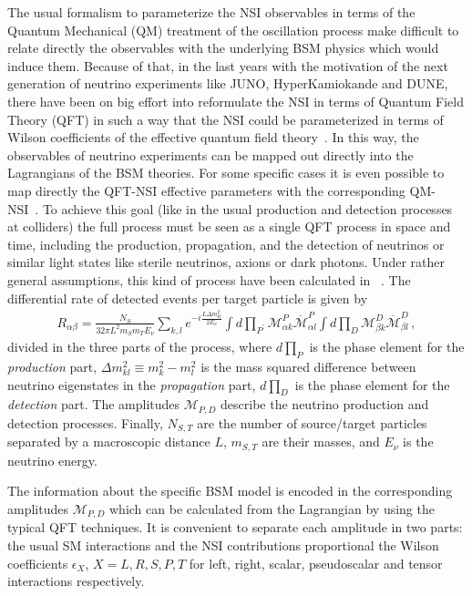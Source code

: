 \documentclass[a4paper,10pt,epsfig,epsf,amsfonts,amsmath]{article}
\begin{document}
The usual formalism to parameterize the NSI observables in terms of the Quantum Mechanical (QM) treatment of the oscillation process make difficult to relate directly the observables with the underlying BSM physics which would induce them. Because of that, in the last years
with the motivation of the next generation of neutrino experiments like JUNO, HyperKamiokande and DUNE, 
there have been on big effort into reformulate the NSI in terms of Quantum Field Theory (QFT) in such a way that the NSI could be parameterized in terms of Wilson
coefficients of the effective quantum field theory~\cite{}. In this way, the observables of neutrino experiments can be mapped out directly into the Lagrangians of the BSM theories.
For some specific cases it is even possible to map directly the QFT-NSI effective parameters with the corresponding QM-NSI~\cite{1910.02971}. 
To achieve this goal (like in the usual production and detection processes at colliders) the full process must be seen as a single QFT process in space and time, including the production, propagation, and the detection of neutrinos or similar light states like sterile neutrinos, axions or dark photons. Under rather general assumptions, this kind of process have been calculated in ~\cite{1910.02971}. The 
differential rate of detected events per target particle is given by
\begin{align}
R_{\alpha \beta}=\frac{N_{S}}{32 \pi L^{2} m_{S} m_{T} E_{\nu}} \sum_{k, l} e^{-i \frac{L \Delta m_{k l}^{2}}{2 E_{\nu}}} \int d \prod_{P^{\prime}} \mathcal{M}_{\alpha k}^{P} \overline{\mathcal{M}}_{\alpha l}^{P} \int d \prod_{D} \mathcal{M}_{\beta k}^{D} \overline{\mathcal{M}}_{\beta l}^{D}\,,
\end{align}
divided in the three parts of the process,
where $d\prod_{P} $ is the phase element for the \emph{production} part,  $\Delta m_{k l}^{2} \equiv m_{k}^{2}-m_{l}^{2}$ is the mass squared difference between neutrino eigenstates in the \emph{propagation} part, $d\prod_{D} $ is the phase element for the \emph{detection} part. The amplitudes $\mathcal{M}_{P,D}$ describe the neutrino production and detection processes. Finally, $N_{S,T}$ are the number of source/target particles separated by a macroscopic distance $L$, $m_{S,T}$ are their masses, and $E_\nu$ is the neutrino energy.

The information about the specific BSM model is encoded in the corresponding  amplitudes $\mathcal{M}_{P,D}$ which can be calculated from the Lagrangian by using the typical QFT techniques. 
It is convenient to separate each amplitude in two parts: the usual SM interactions
and the NSI contributions proportional the Wilson coefficients $\epsilon_X$, $X=L,R,S,P,T$ for left, right, scalar, pseudoscalar and tensor interactions respectively. 
\end{document}
